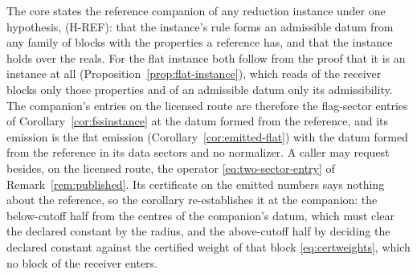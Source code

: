 
The core states the reference companion of any reduction instance under one
hypothesis, (H-REF): that the instance's rule forms an admissible datum from
any family of blocks with the properties a reference has, and that the
instance holds over the reals. For the flat instance both follow from the
proof that it is an instance at all (Proposition~\ref{prop:flat-instance}),
which reads of the receiver blocks only those properties and of an
admissible datum only its admissibility. The companion's entries on the
licensed route are therefore the flag-sector entries of
Corollary~\ref{cor:fssinstance} at the datum formed from the reference, and its emission is the flat emission
(Corollary~\ref{cor:emitted-flat}) with the datum formed from the reference
in its data sectors and no normalizer. A caller may request besides, on the
licensed route, the operator \eqref{eq:two-sector-entry} of
Remark~\ref{rem:published}. Its certificate on the emitted numbers says
nothing about the reference, so the corollary re-establishes it at the
companion: the below-cutoff half from the centres of the companion's datum,
which must clear the declared constant by the radius, and the above-cutoff
half by deciding the declared constant against the certified weight of that
block \eqref{eq:certweights}, which no block of the receiver enters.

